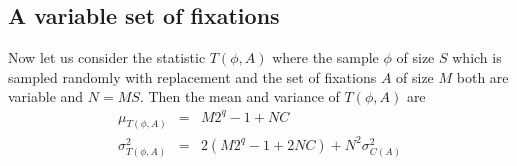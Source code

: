 \subsection{A variable set of fixations}
\begin{lemma} \label{varible set of fixation T phi A}
Now let us consider the statistic $T\left(\phi,A\right)$ where the sample $\phi$ of size $S$ which is sampled randomly with replacement and the set of fixations $A$ of size $M$ both are variable and $N=MS$. Then the mean and variance of $T\left(\phi,A\right)$ are 
\begin{eqnarray*}
\mu_{T\left(\phi,A\right)} &=& M2^q-1 + NC \\
\sigma^{2}_{T\left(\phi,A\right)} &=& 2(M2^q-1 + 2NC) + N^2\sigma_{C\left(A\right)}^2
\end{eqnarray*}
\end{lemma}
